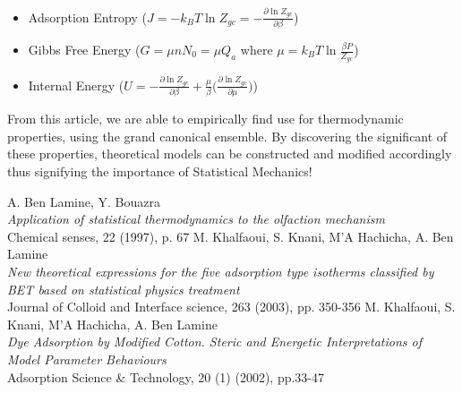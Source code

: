 \documentclass[12pt,a4paper]{article}
\begin{document}
\begin{enumerate}
	\begin{itemize}
		\item Adsorption Entropy ($J = -k_BT\ln Z_{gc} = -\frac{\partial\ln Z_{gc}}{\partial\beta}$)
		\item Gibbs Free Energy ($G = \mu nN_0 = \mu Q_a$ where $\mu = k_BT\ln\frac{\beta P}{Z_{gc}}$)
		\item Internal Energy ($U = -\frac{\partial\ln Z_{gc}}{\partial\beta} + \frac{\mu}{\beta}\big(\frac{\partial\ln Z_{gc}}{\partial\mu}\big)$)
	\end{itemize}
    From this article, we are able to empirically find use for thermodynamic properties, using the grand canonical ensemble. By discovering the significant of these properties, theoretical models can be constructed and modified accordingly thus signifying the importance of Statistical Mechanics!
\end{enumerate}

\begin{thebibliography}{9}
	
	A. Ben Lamine, Y. Bouazra\\
	\textit{Application of statistical thermodynamics to the olfaction mechanism}\\
	Chemical senses, 22 (1997), p. 67
	M. Khalfaoui, S. Knani, M'A Hachicha, A. Ben Lamine\\
	\textit{New theoretical expressions for the five adsorption type isotherms classified by BET based on statistical physics treatment}\\
	Journal of Colloid and Interface science, 263 (2003), pp. 350-356
	M. Khalfaoui, S. Knani, M'A Hachicha, A. Ben Lamine\\
	\textit{Dye Adsorption by Modified Cotton. Steric and Energetic Interpretations of Model Parameter Behaviours}\\
	Adsorption Science \& Technology, 20 (1) (2002), pp.33-47
\end{thebibliography}
\end{document}
